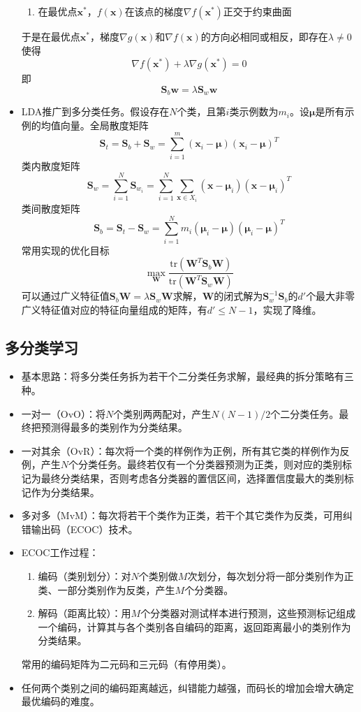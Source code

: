 \documentclass{ctexart}
\begin{document}
\begin{itemize}
\begin{framed}
\begin{enumerate}[(1)]
								\item 在最优点$\bm{x}^*$，$f(\bm{x})$在该点的梯度$\nabla f(\bm{x}^*)$正交于约束曲面
							\end{enumerate}于是在最优点$\bm{x}^*$，梯度$\nabla g(\bm{x})$和$\nabla f(\bm{x})$的方向必相同或相反，即存在$\lambda\neq0$使得\[\nabla f(\bm{x}^*)+\lambda\nabla g(\bm{x}^*)=0\]即\[\bm{S}_b\bm{w}=\lambda\bm{S}_w\bm{w}\]
						\end{framed}
						\item LDA推广到多分类任务。假设存在$N$个类，且第$i$类示例数为$m_i$。设$\bm{\mu}$是所有示例的均值向量。全局散度矩阵\[\bm{S}_t=\bm{S}_b+\bm{S}_w=\sum_{i=1}^{m}(\bm{x}_i-\bm{\mu})(\bm{x}_i-\bm{\mu})^T\]类内散度矩阵\[\bm{S}_w=\sum_{i=1}^{N}\bm{S}_{w_i}=\sum_{i=1}^{N}\sum_{\bm{x}\in X_i}^{}(\bm{x}-\bm{\mu}_i)(\bm{x}-\bm{\mu}_i)^T\]类间散度矩阵\[\bm{S}_b=\bm{S}_t-\bm{S}_w=\sum_{i=1}^{N}m_i(\bm{\mu}_i-\bm{\mu})(\bm{\mu}_i-\bm{\mu})^T\]常用实现的优化目标\[\max\limits_{\bm{W}}\frac{\mathrm{tr}(\bm{W}^T\bm{S}_b\bm{W})}{\mathrm{tr}(\bm{W}^T\bm{S}_w\bm{W})}\]可以通过广义特征值$\bm{S}_b\bm{W}=\lambda\bm{S}_w\bm{W}$求解，$\bm{W}$的闭式解为$\bm{S}_w^{-1}\bm{S}_b$的$d'$个最大非零广义特征值对应的特征向量组成的矩阵，有$d'\le N-1$，实现了降维。
					\end{itemize}
				\subsection{多分类学习}
					\begin{itemize}
						\item 基本思路：将多分类任务拆为若干个二分类任务求解，最经典的拆分策略有三种。
						\item 一对一（OvO）：将$N$个类别两两配对，产生$N(N-1)/2$个二分类任务。最终把预测得最多的类别作为分类结果。
						\item 一对其余（OvR）：每次将一个类的样例作为正例，所有其它类的样例作为反例，产生$N$个分类任务。最终若仅有一个分类器预测为正类，则对应的类别标记为最终分类结果，否则考虑各分类器的置信区间，选择置信度最大的类别标记作为分类结果。
						\item 多对多（MvM）：每次将若干个类作为正类，若干个其它类作为反类，可用纠错输出码（ECOC）技术。
						\item ECOC工作过程：\begin{enumerate}[(1)]
							\item 编码（类别划分）：对$N$个类别做$M$次划分，每次划分将一部分类别作为正类、一部分类别作为反类，产生$M$个分类器。
							\item 解码（距离比较）：用$M$个分类器对测试样本进行预测，这些预测标记组成一个编码，计算其与各个类别各自编码的距离，返回距离最小的类别作为分类结果。
						\end{enumerate}
						常用的编码矩阵为二元码和三元码（有停用类）。
						\item 任何两个类别之间的编码距离越远，纠错能力越强，而码长的增加会增大确定最优编码的难度。
					\end{itemize}
\end{document}
